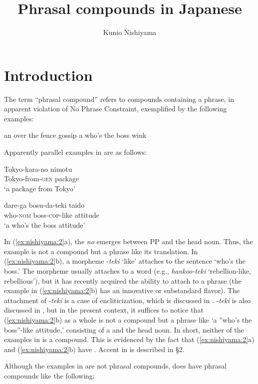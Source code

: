 \documentclass[output=paper]{LSP/langsci}
\author{Kunio Nishiyama\affiliation{Ibaraki University} 
}
\title{Phrasal compounds in Japanese}
\begin{document}
\section{Introduction}\label{sec:nishiyama:1}
 
The term “phrasal compound” refers to compounds containing a phrase, in apparent violation of \citet{Botha1981} No Phrase Constraint, exemplified by the following  examples:

\ea \label{ex:nishiyama:1} 
\ea  an over the fence gossip
\ex  a who’s the boss wink    \citep{Lieber1992}
\z
\z

Apparently parallel examples in  are as follows:

\ea\label{ex:nishiyama:2}
 \ea  
\gll Tokyo-kara-no nimotu\\
    Tokyo-from-\textsc{gen} package\\
\glt ‘a package from Tokyo’

  \ex 
\gll dare-ga    bosu-da-teki      taido\\
    who-\textsc{nom} boss-\textsc{cop}-like  attitude\\
\glt ‘a who’s the boss attitude’
\z
\z

In (\ref{ex:nishiyama:2}a), the   \textit{no} emerges between PP and the head noun. Thus, the example is not a compound but a phrase like its  translation. In (\ref{ex:nishiyama:2}b), a morpheme -\textit{teki} ‘like’ attaches to the sentence ‘who’s the boss.’ The morpheme usually attaches to a word (e.g., \textit{hankoo-teki} ‘rebellion-like, rebellious’), but it has recently acquired the ability to attach to a phrase (the example in (\ref{ex:nishiyama:2}b) has an innovative or substandard flavor). The attachment of -\textit{teki} is a case of encliticization, which is discussed in . -\textit{teki} is also discussed in , but in the present context, it suffices to notice that (\ref{ex:nishiyama:2}b) as a whole is not a compound but a phrase like ‘a ”who’s the boss”-like attitude,’ consisting of a  and the head noun. In short, neither of the examples in  is a compound. This is evidenced by the fact that (\ref{ex:nishiyama:2}a) and (\ref{ex:nishiyama:2}b) have . Accent in  is described in §2.

Although the examples in  are not phrasal compounds,  does have phrasal compounds like the following:
\end{document}
